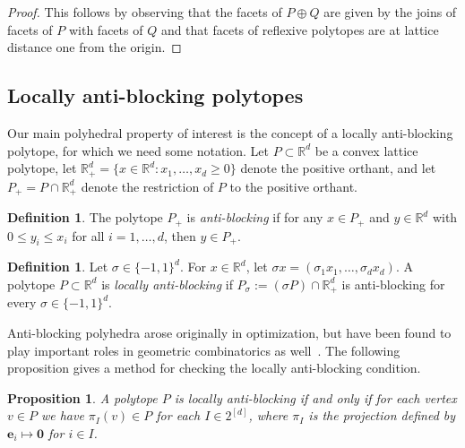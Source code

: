 \documentclass[12pt]{amsart}
\newtheorem{proposition}[theorem]{Proposition}
\theoremstyle{definition}
\newtheorem{definition}[theorem]{Definition}
\newcommand{\defn}[1]{\emph{\color{blue} #1}}
\begin{document}
\begin{proof}
    This follows by observing that the facets of $P\oplus Q$ are given by the joins of facets of $P$ with facets of $Q$ and that facets of reflexive polytopes are at lattice distance one from the origin.
\end{proof}

\subsection{Locally anti-blocking polytopes}\label{sec:locallyanti-blocking}

Our main polyhedral property of interest is the concept of a locally anti-blocking polytope, for which we need some notation.
Let $P\subset \mathbb{R}^d$ be a convex lattice polytope, let $\mathbb{R}^d_+ = \{ x \in \mathbb{R}^d: x_1,\ldots, x_d\geq0\}$ denote the positive orthant, and let $P_+= P\cap \mathbb{R}^d_+$ denote the restriction of $P$ to the positive orthant.

\begin{definition}
The polytope $P_+$ is \defn{anti-blocking} if for any $x\in P_+$ and $y\in \mathbb{R}^d$ with $0\leq y_i\leq x_i$ for all $i=1,\ldots, d$, then $y\in P_+$.
\end{definition}

\begin{definition}
Let $\sigma\in \{-1,1\}^d$.
For $x\in \mathbb{R}^d$, let $\sigma x = (\sigma_1 x_1,\ldots, \sigma_d x_d)$.
A polytope $P \subset \mathbb{R}^d$ is \defn{locally anti-blocking} if $P_\sigma := (\sigma P) \cap\mathbb{R}^d_+$ is anti-blocking for every $\sigma\in \{-1,1\}^d$.
\end{definition}

Anti-blocking polyhedra arose originally in optimization, but have been found to play important roles in geometric combinatorics as well~\cite{kohlolsensanyal, RR}.
The following proposition gives a method for checking the locally anti-blocking condition.

\begin{proposition}\label{prop:lab-iff-projections} 
A polytope $P$ is locally anti-blocking if and only if for each vertex $v\in P$ we have $\pi_I(v)\in P$ for each $I\in 2^{[d]}$, where $\pi_I$ is the projection defined by $\mathbf{e}_i\mapsto \mathbf{0}$ for $i\in I$.
\end{proposition}
\end{document}
